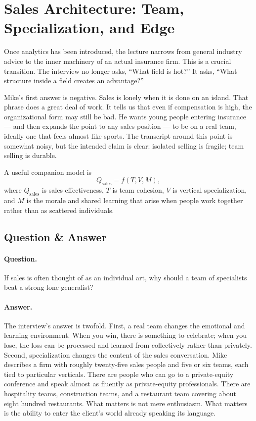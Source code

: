 \section{Sales Architecture: Team, Specialization, and Edge}

Once analytics has been introduced, the lecture narrows from general industry advice to the inner machinery of an actual insurance firm. This is a crucial transition. The interview no longer asks, ``What field is hot?'' It asks, ``What structure inside a field creates an advantage?''

Mike's first answer is negative. Sales is lonely when it is done on an island. That phrase does a great deal of work. It tells us that even if compensation is high, the organizational form may still be bad. He wants young people entering insurance --- and then expands the point to any sales position --- to be on a real team, ideally one that feels almost like sports. The transcript around this point is somewhat noisy, but the intended claim is clear: isolated selling is fragile; team selling is durable.

A useful companion model is
\begin{equation}
Q_{\text{sales}}=f(T,V,M),
\end{equation}
where \(Q_{\text{sales}}\) is sales effectiveness, \(T\) is team cohesion, \(V\) is vertical specialization, and \(M\) is the morale and shared learning that arise when people work together rather than as scattered individuals.

\subsection{Question \& Answer}

\paragraph{Question.} If sales is often thought of as an individual art, why should a team of specialists beat a strong lone generalist?

\paragraph{Answer.} The interview's answer is twofold. First, a real team changes the emotional and learning environment. When you win, there is something to celebrate; when you lose, the loss can be processed and learned from collectively rather than privately. Second, specialization changes the content of the sales conversation. Mike describes a firm with roughly twenty-five sales people and five or six teams, each tied to particular verticals. There are people who can go to a private-equity conference and speak almost as fluently as private-equity professionals. There are hospitality teams, construction teams, and a restaurant team covering about eight hundred restaurants. What matters is not mere enthusiasm. What matters is the ability to enter the client's world already speaking its language.

